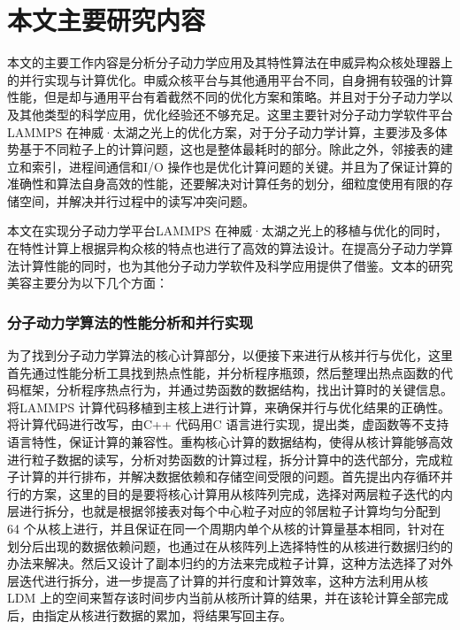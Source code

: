 \section{本文主要研究内容}
本文的主要工作内容是分析分子动力学应用及其特性算法在申威异构众核处理器上的并行实现与计算优化。申威众核平台与其他通用平台不同，自身拥有较强的计算性能，但是却与通用平台有着截然不同的优化方案和策略。并且对于分子动力学以及其他类型的科学应用，优化经验还不够充足。这里主要针对分子动力学软件平台LAMMPS 在神威·太湖之光上的优化方案，对于分子动力学计算，主要涉及多体势基于不同粒子上的计算问题，这也是整体最耗时的部分。除此之外，邻接表的建立和索引，进程间通信和I/O 操作也是优化计算问题的关键。并且为了保证计算的准确性和算法自身高效的性能，还要解决对计算任务的划分，细粒度使用有限的存储空间，并解决并行过程中的读写冲突问题。

本文在实现分子动力学平台LAMMPS 在神威·太湖之光上的移植与优化的同时，在特性计算上根据异构众核的特点也进行了高效的算法设计。在提高分子动力学算法计算性能的同时，也为其他分子动力学软件及科学应用提供了借鉴。文本的研究美容主要分为以下几个方面：

\subsubsection{分子动力学算法的性能分析和并行实现}
为了找到分子动力学算法的核心计算部分，以便接下来进行从核并行与优化，这里首先通过性能分析工具找到热点性能，并分析程序瓶颈，然后整理出热点函数的代码框架，分析程序热点行为，并通过势函数的数据结构，找出计算时的关键信息。将LAMMPS 计算代码移植到主核上进行计算，来确保并行与优化结果的正确性。将计算代码进行改写，由C++ 代码用C 语言进行实现，提出类，虚函数等不支持语言特性，保证计算的兼容性。重构核心计算的数据结构，使得从核计算能够高效进行粒子数据的读写，分析对势函数的计算过程，拆分计算中的迭代部分，完成粒子计算的并行排布，并解决数据依赖和存储空间受限的问题。首先提出内存循环并行的方案，这里的目的是要将核心计算用从核阵列完成，选择对两层粒子迭代的内层进行拆分，也就是根据邻接表对每个中心粒子对应的邻居粒子计算均匀分配到 64 个从核上进行，并且保证在同一个周期内单个从核的计算量基本相同，针对在划分后出现的数据依赖问题，也通过在从核阵列上选择特性的从核进行数据归约的办法来解决。然后又设计了副本归约的方法来完成粒子计算，这种方法选择了对外层迭代进行拆分，进一步提高了计算的并行度和计算效率，这种方法利用从核LDM 上的空间来暂存该时间步内当前从核所计算的结果，并在该轮计算全部完成后，由指定从核进行数据的累加，将结果写回主存。

